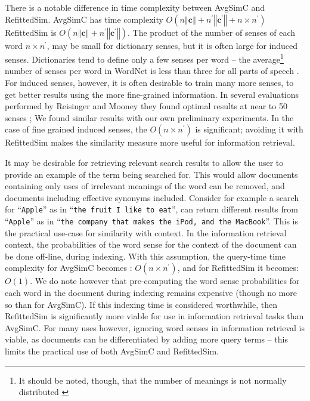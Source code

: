 \documentclass{sig-alternate}
\renewcommand{\c}{\mathbf{c}}
\newcommand{\wordquote}[1]{\enquote{\texttt{#1}}}
\begin{document}
There is a notable difference in time complexity between AvgSimC and RefittedSim.
AvgSimC has time complexity $O(n\left\Vert \c\right\Vert +n^{\prime}\left\Vert \c^{\prime}\right\Vert +n\times n^{\prime})$
RefittedSim is $O(n\left\Vert \c\right\Vert +n^{\prime}\left\Vert \c^{\prime}\right\Vert)$.
The product of the number of senses of each word $n \times n^\prime$, may be small for dictionary senses, but it is often large for induced senses. Dictionaries tend to define only a few senses per word -- the average\footnote{It should be noted, though, that the number of meanings is not normally distributed \parencite{zipf1945meaning}} number of senses per word in WordNet is less than three for all parts of speech \parencite{miller1995wordnet}. For induced senses, however, it is often desirable to train many more senses, to get better results using the more fine-grained information. In several evaluations performed by Reisinger and Mooney they found optimal results at near to 50 senses \parencite{Reisinger2010}; We found similar results with our own preliminary experiments. In the case of fine grained induced senses, the $O(n \times n^\prime)$ is significant; avoiding it with RefittedSim makes the similarity measure more useful for information retrieval.

It may be desirable for retrieving relevant search results to allow the user to provide an example of the term being searched for. This would allow documents containing only uses of irrelevant meanings of the word can be removed, and documents including effective synonyms included. Consider for example a search for \wordquote{Apple} as in \wordquote{the fruit I like to eat}, can return different results from \wordquote{Apple} as in \wordquote{the company that makes the iPod, and the MacBook}. This is the practical use-case for similarity with context.
In the information retrieval context, the probabilities of the word sense for the context of the document can be done off-line, during indexing. With this assumption, the query-time time complexity for AvgSimC becomes : $O(n\times n^{\prime})$, and for RefittedSim it becomes: $O(1)$.
We do note however that pre-computing the word sense probabilities for each word in the document during indexing remains expensive (though no more so than for AvgSimC). If this indexing time is considered worthwhile, then RefittedSim is significantly more viable for use in information retrieval tasks than AvgSimC. For many uses however, ignoring word senses in information retrieval is viable, as documents can be differentiated by adding more query terms -- this limits the practical use of both AvgSimC and RefittedSim.
\end{document}
